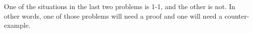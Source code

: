 \documentclass[11pt, letterpaper]{report}
\begin{document}
\bigskip

One of the situations in the last two problems is 1-1, and the other is not.  In other words, one of those
problems will need a proof and one will need a counter-example.

\bigskip

\end{document}

